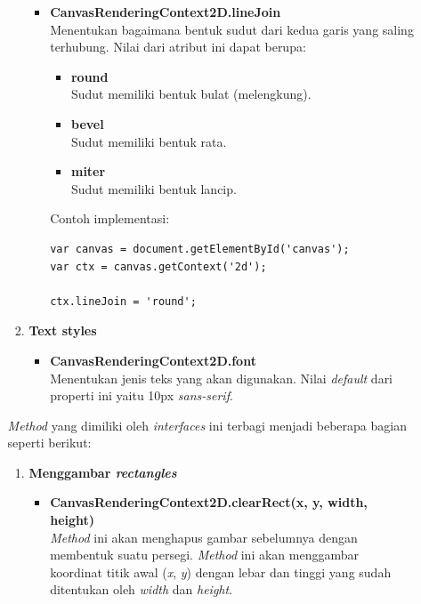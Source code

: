 \documentclass[a4paper,twoside]{article}
\begin{document}
\begin{enumerate}
\begin{enumerate}
\begin{enumerate}
\begin{itemize}
					\item \textbf{CanvasRenderingContext2D.lineJoin} \\ Menentukan bagaimana bentuk sudut dari kedua garis yang saling terhubung. Nilai dari atribut ini dapat berupa:
					\begin{itemize}
						\item \textbf{round} \\ Sudut memiliki bentuk bulat (melengkung).
						\item \textbf{bevel} \\ Sudut memiliki bentuk rata.
						\item \textbf{miter} \\ Sudut memiliki bentuk lancip.
					\end{itemize}
					Contoh implementasi:
\begin{lstlisting}
var canvas = document.getElementById('canvas');
var ctx = canvas.getContext('2d');
					
ctx.lineJoin = 'round';
\end{lstlisting}
				\end{itemize}
				
				\item \textbf{Text styles} 
				\begin{itemize}
					\item \textbf{CanvasRenderingContext2D.font} \\ Menentukan jenis teks yang akan digunakan. Nilai \textit{default} dari properti ini yaitu 10px \textit{sans-serif}.
				\end{itemize}
				
			\end{enumerate}
			
			\textit{Method} yang dimiliki oleh \textit{interfaces} ini terbagi menjadi beberapa bagian seperti berikut:
			\begin{enumerate}
				\item \textbf{Menggambar \textit{rectangles}}
				\begin{itemize}
					\item \textbf{CanvasRenderingContext2D.clearRect(x, y, width, height)} \\ 
					\textit{Method} ini akan menghapus gambar sebelumnya dengan membentuk suatu persegi. \textit{Method} ini akan menggambar koordinat titik awal (\textit{x}, \textit{y}) dengan lebar dan tinggi yang sudah ditentukan oleh \textit{width} dan \textit{height}. 
					

\end{itemize}
\end{enumerate}
\end{enumerate}
\end{enumerate}
\end{document}
